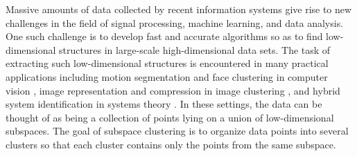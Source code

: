 Massive amounts of data collected by recent information systems give rise to new challenges in the field of signal processing, machine learning, and data analysis.  One such challenge is to develop fast and accurate algorithms so as to find low-dimensional structures in large-scale high-dimensional data sets. The task of extracting such low-dimensional structures is encountered in many practical applications including motion segmentation and face clustering in computer vision \cite{yang2008unsupervised,vidal2008multiframe}, image representation and compression in image clustering \cite{ho2003clustering,hong2006multiscale}, and hybrid system identification in systems theory \cite{vidal2003algebraic}. In these settings, the data can be thought of as being a collection of points lying on a union of low-dimensional subspaces. The goal of subspace clustering is to organize data points into several clusters so that each cluster contains only the points from the same subspace.

